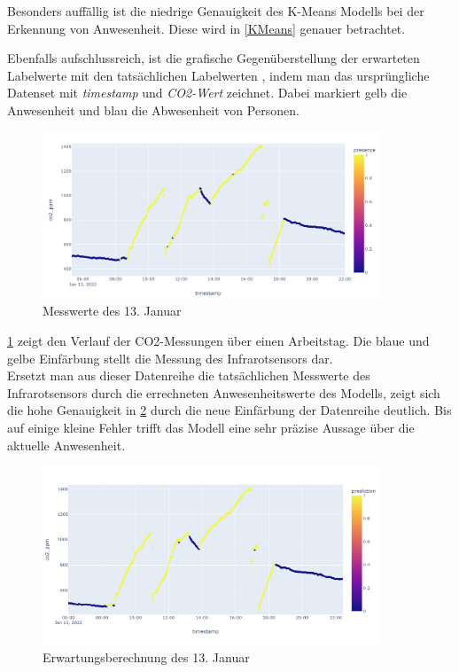 Besonders auffällig ist die niedrige Genauigkeit des K-Means Modells bei der Erkennung von Anwesenheit. Diese 
wird in \ref{KMeans} genauer betrachtet.
\newpage

Ebenfalls aufschlussreich, ist die grafische Gegenüberstellung der erwarteten Labelwerte mit den tatsächlichen Labelwerten
, indem man das ursprüngliche Datenset mit \textit{timestamp} und \textit{CO2-Wert} zeichnet. Dabei markiert gelb 
die Anwesenheit und blau die Abwesenheit von Personen.

\begin{figure}[h]
    \centering
    \includegraphics[width=0.9\textwidth]{pic/nov23_actual.png}
    \caption{Messwerte des 13. Januar}
    \label{fig:nov23}
\end{figure}

\ref{fig:nov23} zeigt den Verlauf der CO2-Messungen über einen Arbeitstag. Die blaue und gelbe Einfärbung stellt
die Messung des Infrarotsensors dar.\\ 
Ersetzt man aus dieser Datenreihe die tatsächlichen Messwerte des Infrarotsensors durch die errechneten 
Anwesenheitswerte des Modells, zeigt sich die hohe Genauigkeit in \ref{fig:nov23_pred} durch die neue Einfärbung 
der Datenreihe deutlich. 
Bis auf einige kleine Fehler trifft das Modell eine sehr präzise Aussage über die aktuelle Anwesenheit.

\begin{figure}[h]
    \centering
    \includegraphics[width=0.9\textwidth]{pic/nov23_predicted.png}
    \caption{Erwartungsberechnung des 13. Januar}
    \label{fig:nov23_pred}
\end{figure}


